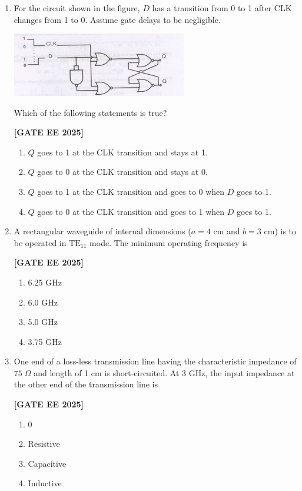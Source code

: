 \documentclass[12pt]{article}
\begin{document}
\begin{enumerate}[leftmargin=*, label=\textbf{Q.\arabic*:}]
\item For the circuit shown in the figure, $D$ has a transition from 0 to 1 after CLK changes from 1 to 0. Assume gate delays to be negligible.

\begin{center}
\includegraphics[width=0.6\textwidth]{figs/q60.png}
\end{center}

Which of the following statements is true?
 
\noindent \textbf{[GATE EE 2025]}
\begin{enumerate}[label=(\Alph*)]
  \item $Q$ goes to 1 at the CLK transition and stays at 1.
  \item $Q$ goes to 0 at the CLK transition and stays at 0.
  \item $Q$ goes to 1 at the CLK transition and goes to 0 when $D$ goes to 1.
  \item $Q$ goes to 0 at the CLK transition and goes to 1 when $D$ goes to 1.
\end{enumerate}

\item A rectangular waveguide of internal dimensions ($a=4$ cm and $b=3$ cm) is to be operated in $\mathrm{TE}_{11}$ mode. The minimum operating frequency is
 
\noindent \textbf{[GATE EE 2025]}
\begin{enumerate}[label=(\Alph*)]
  \item 6.25 GHz
  \item 6.0 GHz
  \item 5.0 GHz
  \item 3.75 GHz
\end{enumerate}

\item One end of a loss-less transmission line having the characteristic impedance of $75\;\Omega$ and length of 1 cm is short-circuited. At 3 GHz, the input impedance at the other end of the transmission line is
 
\noindent \textbf{[GATE EE 2025]}
\begin{enumerate}[label=(\Alph*)]
  \item 0
  \item Resistive
  \item Capacitive
  \item Inductive
\end{enumerate}


\end{enumerate}
\end{document}
